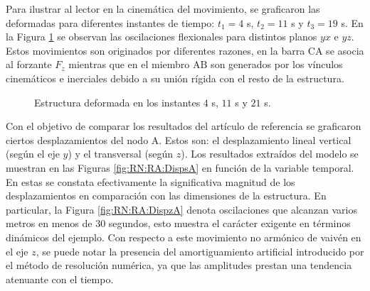 Para ilustrar al lector en la cinemática del movimiento, se graficaron las deformadas para diferentes instantes de tiempo: $t_1=4$ s, $t_2=11$ s y $t_3=19$ s. En la Figura \ref{fig:RN:RA:Deformadas} se observan las oscilaciones flexionales para distintos planos $yx$ e $yz$. Estos movimientos son originados por diferentes razones, en la barra $\text{CA}$ se asocia al forzante $F_z$ mientras que en el miembro $\text{AB}$ son generados por los vínculos cinemáticos e inerciales debido a su unión rígida con el resto de la estructura.

\begin{figure}[htbp]
	\centering
	\def\svgwidth{120mm}
	
	\caption{Estructura deformada en los instantes $4$ s, $11$ s y $21$ s.}
	\label{fig:RN:RA:Deformadas}
\end{figure}  

Con el objetivo de comparar los resultados del artículo de referencia se graficaron ciertos desplazamientos del nodo A. Estos son: el desplazamiento lineal vertical (según el eje $y$) y el transversal (según $z$). Los resultados extraídos del modelo se muestran en las Figuras \ref{fig:RN:RA:DispsA} en función de la variable temporal. En estas se constata efectivamente la significativa magnitud de los desplazamientos en comparación con las dimensiones de la estructura. En particular, la Figura \ref{fig:RN:RA:DispzA} denota oscilaciones que alcanzan varios metros en menos de 30 segundos, esto muestra el carácter exigente en términos dinámicos del ejemplo. Con respecto a este movimiento no armónico  de vaivén en el eje $z$, se puede notar la presencia del amortiguamiento artificial introducido por el método de resolución numérica, ya que las amplitudes prestan una tendencia atenuante con el tiempo.  

